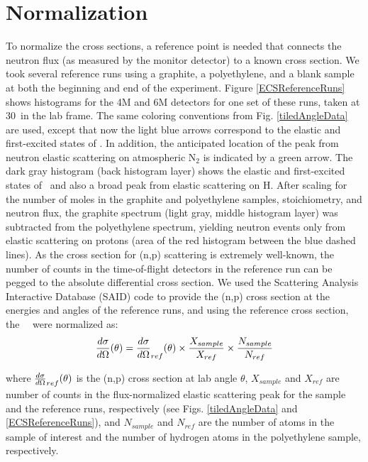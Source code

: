 \section{Normalization}
To normalize the cross sections, a reference point is needed that connects the
neutron flux (as measured by the monitor detector) to a known cross section.
We took several reference runs using a graphite,
a polyethylene, and a blank sample at both the beginning and end of the experiment.
Figure \ref{ECSReferenceRuns} shows histograms for the 4M and 6M detectors for
one set of these runs, taken at 30\textdegree\ in the lab frame.
The same coloring conventions from Fig.
\ref{tiledAngleData} are used, except that now the light blue arrows correspond to
the elastic and first-excited states of \cTwelve. In addition, the anticipated
location of the peak from neutron elastic scattering on atmospheric N$_{2}$ is
indicated by a green arrow. The dark gray histogram (back
histogram layer) shows the elastic and first-excited states
of \cTwelve\ and also a broad peak from elastic scattering on H.
After scaling for the number
of moles in the graphite and polyethylene samples, stoichiometry, and neutron
flux, the graphite spectrum (light gray, middle histogram layer) was subtracted from the polyethylene
spectrum, yielding neutron events only from elastic scattering on protons (area of
the red histogram between the blue dashed lines). As the cross section for
(n,p) scattering is extremely well-known, the number of counts in the
time-of-flight detectors in the reference run can be pegged to the absolute
differential cross section.
We used the Scattering Analysis Interactive Database (SAID) code \cite{SAIDCode}
to provide the (n,p) cross section at the energies and angles of the reference
runs, and using the reference cross section, the \snTwelveFour\
\el\ were normalized as:
\begin{equation} \label{ECSCalculation}
    \el(\theta) = \el_{ref}(\theta)
    \times \frac{X_{sample}}{X_{ref}} \times
    \frac{N_{sample}}{N_{ref}}
\end{equation}

\noindent
where $\el_{ref}(\theta)$ is the (n,p) cross section at lab angle $\theta$, $X_{sample}$
and $X_{ref}$ are number of counts in the flux-normalized elastic scattering peak for the sample
and the reference runs, respectively (see Figs. \ref{tiledAngleData} and
\ref{ECSReferenceRuns}), and $N_{sample}$ and $N_{ref}$ are the number of atoms in
the sample of interest and the number of hydrogen atoms in the polyethylene
sample, respectively.

